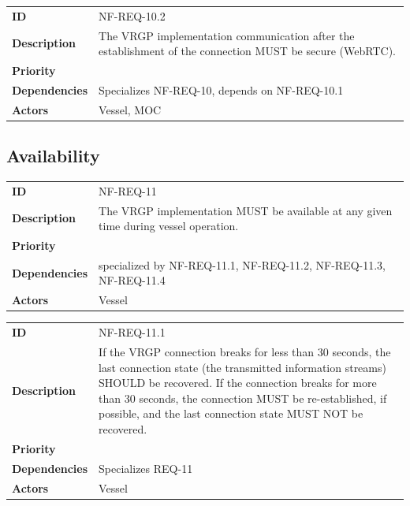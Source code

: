 \begin{table}[H]
	\centering
	\begin{tabularx}{\textwidth}{ l X }
		\rowcolor[HTML]{E7E7E7}
		\textbf{ID} & NF-REQ-10.2 \\
		\textbf{Description} & The VRGP implementation communication after the establishment of the connection MUST be secure (WebRTC). \\
		\rowcolor[HTML]{E7E7E7}
		\textbf{Priority} & \priohigh \\
		\textbf{Dependencies} & Specializes NF-REQ-10, depends on NF-REQ-10.1 \\
		\rowcolor[HTML]{E7E7E7}
		\textbf{Actors} & Vessel, MOC \\
	\end{tabularx}
	\label{table:nf-req-10.2}
\end{table}

\subsection{Availability}

\begin{table}[H]
	\centering
	\begin{tabularx}{\textwidth}{ l X }
		\rowcolor[HTML]{E7E7E7}
		\textbf{ID} & NF-REQ-11 \\
		\textbf{Description} & The VRGP implementation MUST be available at any given time during vessel operation. \\
		\rowcolor[HTML]{E7E7E7}
		\textbf{Priority} & \priohigh \\
		\textbf{Dependencies} & specialized by NF-REQ-11.1, NF-REQ-11.2, NF-REQ-11.3, NF-REQ-11.4 \\
		\rowcolor[HTML]{E7E7E7}
		\textbf{Actors} & Vessel \\
	\end{tabularx}
	\label{table:nf-req-11}
\end{table}

\begin{table}[H]
	\centering
	\begin{tabularx}{\textwidth}{ l X }
		\rowcolor[HTML]{E7E7E7}
		\textbf{ID} & NF-REQ-11.1 \\
		\textbf{Description} & If the VRGP connection breaks for less than 30 seconds, the last connection state (the transmitted information streams) SHOULD be recovered. If the connection breaks for more than 30 seconds, the connection MUST be re-established, if possible, and the last connection state MUST NOT be recovered. \\
		\rowcolor[HTML]{E7E7E7}
		\textbf{Priority} & \priohigh \\
		\textbf{Dependencies} & Specializes REQ-11 \\
		\rowcolor[HTML]{E7E7E7}
		\textbf{Actors} & Vessel \\
	\end{tabularx}
	\label{table:nf-req-11.1}
\end{table}

